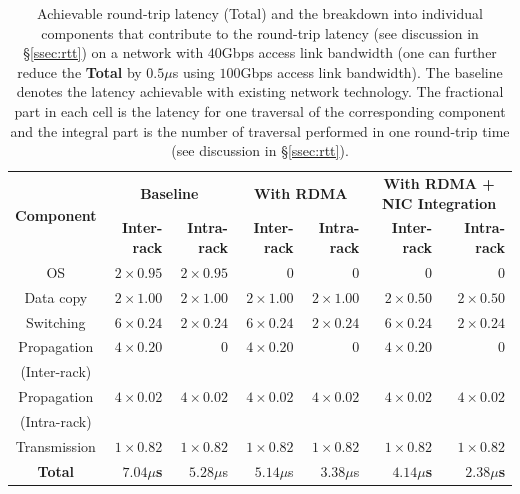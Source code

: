 %
\begin{table}
  \centering
  \begin{tabular}{c|r|r|r|r|r|r}
		\multirow{2}{*}{\bf Component} & \multicolumn{2}{c|}{\bf Baseline} &  \multicolumn{2}{c|}{\bf With RDMA} &  \multicolumn{2}{c}{\bf With RDMA + NIC Integration}\\
				 &  {\bf Inter-rack} &  {\bf Intra-rack} & {\bf Inter-rack} &  {\bf Intra-rack} & {\bf Inter-rack} &  {\bf Intra-rack} \\\hline	\hline
    OS & $2 \times 0.95$ & $2 \times 0.95$ & $0$ & $0$ & $0$ & $0$\\\hline
    Data copy & $2 \times 1.00$ &  $2 \times 1.00$ & $2 \times 1.00$ & $2 \times 1.00$ & $2 \times 0.50$ & $2 \times 0.50$\\\hline
    Switching & $6 \times 0.24$ &  $2 \times 0.24$ & $6 \times 0.24$ & $2 \times 0.24$ & $6 \times 0.24$ & $2 \times 0.24$ \\\hline
    Propagation & $4 \times 0.20$ & $0$ & $4 \times 0.20$ & $0$ & $4 \times 0.20$ & $0$\\
    (Inter-rack) &  &   & & & &\\\hline
    Propagation & $4 \times 0.02$ & $4 \times 0.02$ & $4 \times 0.02$ & $4 \times 0.02$ & $4 \times 0.02$ & $4 \times 0.02$\\
    (Intra-rack) &  &   & & & \\\hline
    Transmission & $1 \times 0.82$ & $1 \times 0.82$ & $1 \times 0.82$ & $1 \times 0.82$ & $1 \times 0.82$ & $1 \times 0.82$\\\hline
    \hline
    {\bf Total} & {\bf $7.04\mu$s} & {$5.28\mu$s} & {$5.14\mu$s} & {$3.38\mu$s} & {\bf $4.14\mu$s} & {\bf $2.38\mu$s}\\\hline
	\hline
  \end{tabular}
  \vspace{0.1in}
  \caption{\small{Achievable round-trip latency (Total) and the breakdown into individual components that contribute to the round-trip latency (see discussion in \S\ref{ssec:rtt}) on a network with $40$Gbps access link bandwidth (one can further reduce the {\bf Total} by $0.5\mu$s using $100$Gbps access link bandwidth). The baseline denotes the latency achievable with existing network technology. The fractional part in each cell is the latency for one traversal of the corresponding component and the integral part is the number of traversal performed in one round-trip time (see discussion in \S\ref{ssec:rtt}).}}
  \label{tab:latency}
\end{table}
%
